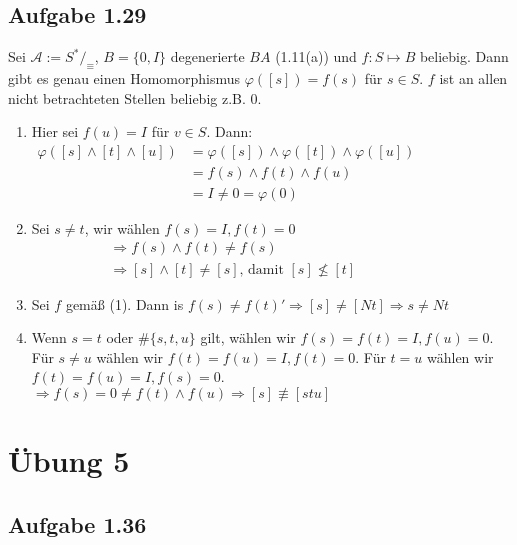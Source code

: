 \documentclass[10pt, a4paper]{article}
\begin{document}
\subsection{Aufgabe 1.29} Sei $\mathcal{A} := S^\ast/_{\equiv}$, $B=\{0,I \}$ degenerierte $BA$ (1.11(a)) und $f:S\mapsto B$ beliebig. Dann gibt es genau einen Homomorphismus $\varphi([s])=f(s)$ für $s\in S$. $f$ ist an allen nicht betrachteten Stellen beliebig z.B. 0.
\begin{enumerate}
	\item Hier sei $f(u)=I$ für $v\in S$. Dann:
		 \begin{align*}
			\varphi([s]\wedge[t]\wedge[u]) &= \varphi([s])\wedge\varphi([t])\wedge\varphi([u])	\hspace{2in}\\
			&= f(s)\wedge f(t)\wedge f(u)	\\
			&= I\neq 0=\varphi(0)
	 	\end{align*}
 	\item Sei $s\neq t$, wir wählen $f(s)=I,f(t)=0$
 		\begin{align*}
 			&\Rightarrow f(s)\wedge f(t)\neq f(s)	\hspace{2in}\\
 			&\Rightarrow [s]\wedge[t]\neq[s]\text{, damit }[s]\nleq [t]
 		\end{align*}
 	\item Sei $f$ gemäß (1). Dann is $f(s)\neq f(t)'\Rightarrow[s]\neq[Nt]\Rightarrow s\neq Nt$
 	\item Wenn $s=t$ oder $\#\{s,t,u\}$ gilt, wählen wir $f(s)=f(t)=I, f(u)=0$. Für $s\neq u$ wählen wir $f(t)=f(u)=I, f(t)=0$. Für $t=u$ wählen wir $f(t)=f(u)=I, f(s)=0$. \\
 	
 	$\Rightarrow f(s)=0\neq f(t)\wedge f(u)\Rightarrow [s]\not\equiv[stu]$
\end{enumerate}



\section{Übung 5}
\subsection{Aufgabe 1.36}
\end{document}
